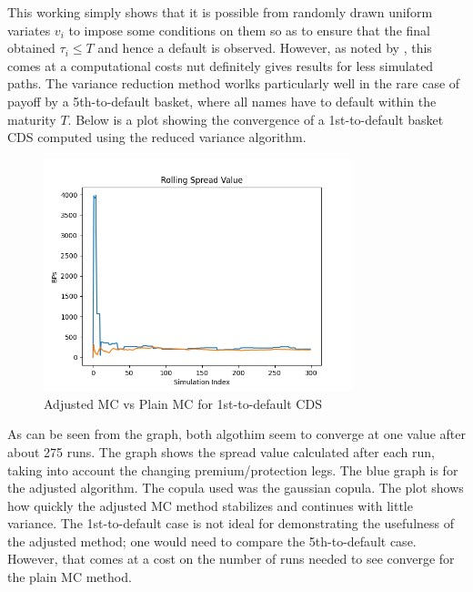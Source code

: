 \documentclass[a4paper,12pt]{article}
\begin{document}
This working simply  shows that it is possible from randomly drawn uniform variates $v_i$ to impose some conditions on them so as to ensure that the final obtained $\tau_i \leq T$ and hence a default is observed. However, as noted by \cite{milicia}, this comes at a computational costs nut definitely gives results for less simulated paths. The variance reduction method worlks particularly well in the rare case of payoff by a 5th-to-default basket, where all names have to default within the maturity $T$. 
Below is a plot showing the convergence of a 1st-to-default basket CDS computed using the reduced variance algorithm. 

\begin{figure}[h]

\centering
\includegraphics[width=0.8\textwidth]{rolling_spread_mc}
\caption{Adjusted MC vs Plain MC for 1st-to-default CDS}
\label{image-adjusted_vs_plain_mc}

\end{figure}

As can be seen from the graph, both algothim seem to converge at one value after about 275 runs. The graph shows the spread value calculated after each run, taking into account the changing premium/protection legs. The blue graph is for the adjusted algorithm. The copula used was the gaussian copula. The plot shows how quickly the adjusted MC method stabilizes and continues with little variance. The 1st-to-default case is not ideal for demonstrating the usefulness of the adjusted method; one would need to compare the 5th-to-default case. However, that comes at a cost on the number of runs needed to see converge for the plain MC method.  

\clearpage
\end{document}
